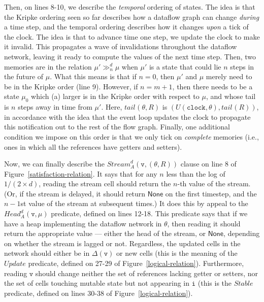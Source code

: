 \documentclass[preprint]{sigplanconf}
\newcommand{\futurestate}[4]{{#3} \gg^{#1}_{#2} {#4}}
\newcommand{\term}[1]{\ensuremath{\mathtt{{#1}}}}
\newcommand{\Head}{\mathit{Head}}
\newcommand{\Stream}{\mathit{Stream}}
\newcommand{\Update}{\mathit{Update}}
\newcommand{\Stable}{\mathit{Stable}}
\newcommand{\None}{\mathsf{None}}
\newcommand{\tail}[2][]{\mathit{tail}^{#1}(#2)}
\begin{document}
Then, on lines 8-10, we describe the \emph{temporal} ordering of
states.  The idea is that the Kripke ordering seen so far describes
how a dataflow graph can change \emph{during} a time step, and the
temporal ordering describes how it changes \emph{upon} a tick of the
clock. The idea is that to advance time one step, we update the clock
to make it invalid. This propagates a wave of invalidations throughout
the dataflow network, leaving it ready to compute the values of the
next time step. Then, two memories are in the relation
$\futurestate{d}{n}{\mu'}{\mu}$ when $\mu'$ is a state that could lie
$n$ steps in the future of $\mu$. What this means is that if $n = 0$,
then $\mu'$ and $\mu$ merely need to be in the Kripke order (line 9).
However, if $n = m + 1$, then there needs to be a state $\mu_0$ which
(a) larger is in the Kripke order with respect to $\mu$, and whose
tail is $n$ steps away in time from $\mu'$. Here, $\tail{\theta, R}$
is $(U(\term{clock}, \theta), \tail{R})$, in accordance with the idea
that the event loop updates the clock to propagate this notification
out to the rest of the flow graph. Finally, one additional condition
we impose on this order is that we only tick on \emph{complete}
memories (i.e., ones in which all the references have getters and
setters). 

Now, we can finally describe the $\Stream^d_A(\term{v}, (\theta, R))$
clause on line 8 of Figure~\ref{satisfaction-relation}. It says that
for any $n$ less than the log of $1/(2 \times d)$, reading the stream
cell should return the $n$-th value of the stream. (Or, if the stream
is delayed, it should return $\None$ on the first timestep, and the
$n-1$st value of the stream at subsequent times.) It does this by
appeal to the $\Head^d_A(\term{v}, \mu)$ predicate, defined on lines
12-18. This predicate says that if we have a heap implementing the
dataflow network in $\theta$, then reading it should return the
appropriate value --- either the head of the stream, or $\None$,
depending on whether the stream is lagged or not. Regardless, the
updated cells in the network should either be in $\Delta(\term{v})$ or
new cells (this is the meaning of the $\Update$ predicate, defined on
27-29 of Figure~\ref{logical-relation}). Furthermore, reading \term{v}
should change neither the set of references lacking getter or setters,
nor the set of cells touching mutable state but not appearing in
\term{i} (this is the $\Stable$ predicate, defined on lines 30-38 of 
Figure~\ref{logical-relation}). 
\end{document}
